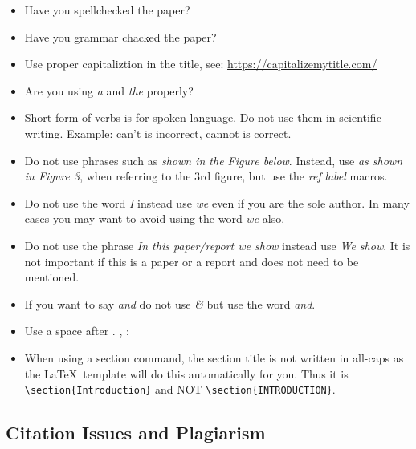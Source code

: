 \begin{itemize}[label=$\Box$]
    \item Have you spellchecked the paper?
    \item Have you grammar chacked the paper?
    \item Use proper capitaliztion in the title, see: \url{https://capitalizemytitle.com/}
     \item Are you using \textit{a} and \textit{the} properly?
    \item Short form of verbs is for spoken language. Do not use them
      in scientific writing. Example: can't is incorrect, cannot is correct.
    \item Do not use phrases such as \textit{shown in the Figure
        below}. Instead, use \textit{as shown in Figure 3}, when
      referring to the 3rd figure, but use the \textit{ref} \textit{label}
      macros.
    \item Do not use the word \textit{I} instead use \textit{we} even if you
      are the sole author. In many cases you may want to avoid using
      the word \textit{we} also.
    \item Do not use the phrase \textit{In this paper/report we show}
      instead use \textit{We show}. It is not important if this is a
      paper or a report and does not need to be mentioned. 
    \item If you want to say \textit{and} do not use \textit{\&} but use the
      word \textit{and}.
    \item Use a space after . , :
    \item When using a section command, the section title is not
      written in all-caps as the \LaTeX~template will do this
      automatically for you. Thus it is \verb|\section{Introduction}|
      and NOT \verb|\section{INTRODUCTION}|.

\end{itemize}

\subsection{Citation Issues and Plagiarism}

